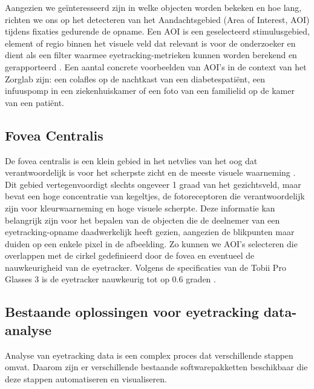 Aangezien we geïnteresseerd zijn in welke objecten worden bekeken en hoe lang, richten we ons op het detecteren van het Aandachtsgebied (Area of Interest, AOI) tijdens fixaties gedurende de opname.
Een AOI is een geselecteerd stimulusgebied, element of regio binnen het visuele veld dat relevant is voor de onderzoeker en dient als een filter waarmee eyetracking-metrieken kunnen worden berekend en gerapporteerd \autocite{PAUSZEK2023100031}.
Een aantal concrete voorbeelden van AOI's in de context van het Zorglab zijn: een colafles op de nachtkast van een diabetespatiënt, een infuuspomp in een ziekenhuiskamer of een foto van een familielid op de kamer van een patiënt.

\subsection{Fovea Centralis}
\label{sec:fovea-centralis}

De fovea centralis is een klein gebied in het netvlies van het oog dat verantwoordelijk is voor het 
scherpste zicht en de meeste visuele waarneming \autocite{REMINGTON201261}.
Dit gebied vertegenvoordigt slechts ongeveer 1 graad van het gezichtsveld, maar bevat een hoge concentratie van kegeltjes, 
de fotoreceptoren die verantwoordelijk zijn voor kleurwaarneming en hoge visuele scherpte.
Deze informatie kan belangrijk zijn voor het bepalen van de objecten die de deelnemer van een eyetracking-opname daadwerkelijk heeft gezien,
aangezien de blikpunten maar duiden op een enkele pixel in de afbeelding. 
Zo kunnen we AOI's selecteren die overlappen met de cirkel gedefinieerd door de fovea en eventueel de nauwkeurigheid van de eyetracker.
Volgens de specificaties van de Tobii Pro Glasses 3 is de eyetracker nauwkeurig tot op 0.6 graden \autocite{tobii_pro_glasses_3}.

\subsection{Bestaande oplossingen voor eyetracking data-analyse}

Analyse van eyetracking data is een complex proces dat verschillende stappen omvat. Daarom zijn er verschillende bestaande softwarepakketten beschikbaar die deze stappen automatiseren en visualiseren.

